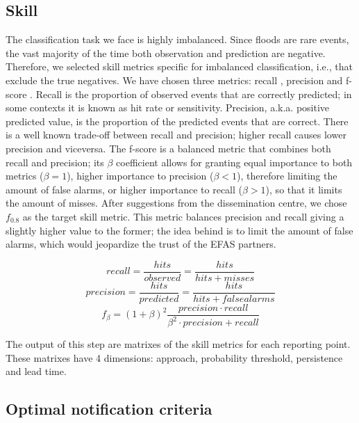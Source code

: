 \documentclass[preprint,12pt]{elsarticle}
\begin{document}
\subsection{Skill}

The classification task we face is highly imbalanced. Since floods are rare events, the vast majority of the time both observation and prediction are negative. Therefore, we selected skill metrics specific for imbalanced classification, i.e., that exclude the true negatives. We have chosen three metrics: recall , precision  and f-score . Recall is the proportion of observed events that are correctly predicted; in some contexts it is known as hit rate or sensitivity. Precision, a.k.a. positive predicted value, is the proportion of the predicted events that are correct. There is a well known trade-off between recall  and precision; higher recall  causes lower precision  and viceversa. The f-score  is a balanced metric that combines both recall  and precision; its $\beta$ coefficient allows for granting equal importance to both metrics ($\beta = 1$), higher importance to precision ($\beta < 1$), therefore limiting the amount of false alarms, or higher importance to recall ($\beta > 1$), so that it limits the amount of misses. After suggestions from the dissemination centre, we chose $f_{0.8}$ as the target skill metric. This metric balances precision and recall giving a slightly higher value to the former; the idea behind is to limit the amount of false alarms, which would jeopardize the trust of the EFAS partners.

\begin{equation}
    recall = \frac{hits}{observed} = \frac{hits}{hits + misses}
\end{equation}
\begin{equation}
    precision = \frac{hits}{predicted} = \frac{hits}{hits + false alarms}
\end{equation}
\begin{equation}
    f_{\beta} = \left( 1 + \beta \right)^2 \frac{precision \cdot recall}{\beta^2 \cdot precision + recall}
\end{equation}

The output of this step are matrixes of the skill metrics for each reporting point. These matrixes have 4 dimensions: approach, probability threshold, persistence and lead time.

\subsection{Optimal notification criteria}
\end{document}
